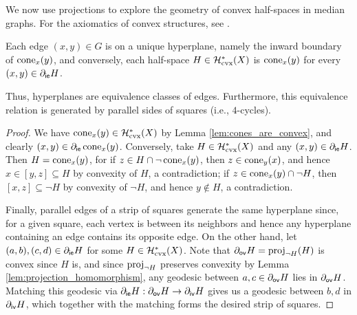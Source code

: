 \documentclass[reqno]{amsart}
\begin{document}
    We now use projections to explore the geometry of convex half-spaces in median graphs. For the axiomatics of convex structures, see \cite{vdV93}.

    \begin{proposition}\label{prp:half-spaces_are_cones}
        Each edge $(x,y)\in G$ is on a unique hyperplane, namely the inward boundary of $\operatorname{cone}_x(y)$, and conversely, each half-space $H\in\mathcal{H}^\ast_\mathrm{cvx}(X)$ is $\operatorname{cone}_x(y)$ for every $(x,y)\in\partial_\mathsf{ie}H$.

        Thus, hyperplanes are equivalence classes of edges. Furthermore, this equivalence relation is generated by parallel sides of squares (i.e., $4$-cycles).
    \end{proposition}
    \begin{proof}
        We have $\operatorname{cone}_x(y)\in\mathcal{H}_\mathrm{cvx}^\ast(X)$ by Lemma \ref{lem:cones_are_convex}, and clearly $(x,y)\in\partial_\mathsf{ie}\operatorname{cone}_x(y)$. Conversely, take $H\in\mathcal{H}_\mathrm{cvx}^\ast(X)$ and any $(x,y)\in\partial_\mathsf{ie}H$. Then $H=\operatorname{cone}_x(y)$, for if $z\in H\cap\lnot\operatorname{cone}_x(y)$, then $z\in\operatorname{cone}_y(x)$, and hence $x\in[y,z]\subseteq H$ by convexity of $H$, a contradiction; if $z\in\operatorname{cone}_x(y)\cap\lnot H$, then $[x,z]\subseteq\lnot H$ by convexity of $\lnot H$, and hence $y\not\in H$, a contradiction.

        Finally, parallel edges of a strip of squares generate the same hyperplane since, for a given square, each vertex is between its neighbors and hence any hyperplane containing an edge contains its opposite edge. On the other hand, let $(a,b),(c,d)\in\partial_\mathsf{ie}H$ for some $H\in\mathcal{H}_\mathrm{cvx}^\ast(X)$. Note that $\partial_\mathsf{ov}H=\operatorname{proj}_{\lnot H}(H)$ is convex since $H$ is, and since $\operatorname{proj}_{\lnot H}$ preserves convexity by Lemma \ref{lem:projection_homomorphism}, any geodesic between $a,c\in\partial_\mathsf{ov}H$ lies in $\partial_\mathsf{ov}H$. Matching this geodesic via $\partial_\mathsf{ie}H:\partial_\mathsf{ov}H\to\partial_\mathsf{iv}H$ gives us a geodesic between $b,d$ in $\partial_\mathsf{iv}H$, which together with the matching forms the desired strip of squares.
    \end{proof}
\end{document}
